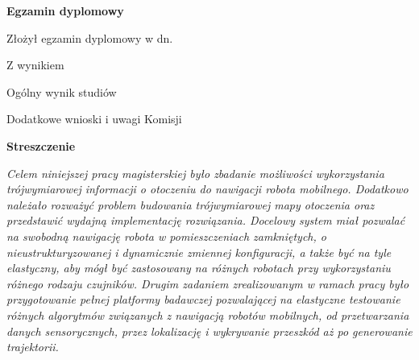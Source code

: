 \begin{titlepage}
    \begin{center}
 	{\large\bfseries Egzamin dyplomowy} \par\bigskip\bigskip
    \end{center}
    \par\noindent\vspace{1.5\baselineskip}
    Złożył egzamin dyplomowy w dn. \dotfill
    \par\noindent\vspace{1.5\baselineskip}
    Z wynikiem \dotfill
    \par\noindent\vspace{1.5\baselineskip}
    Ogólny wynik studiów \dotfill
    \par\noindent\vspace{1.5\baselineskip}
    Dodatkowe wnioski i uwagi Komisji \dotfill
    \par\noindent\vspace{1.5\baselineskip}
    \dotfill


	    \cleardoublepage
    \newpage\thispagestyle{empty}
    \begin{center}
	{\large\bfseries Streszczenie}\par\bigskip
    \end{center}

    {\itshape
    Celem niniejszej pracy magisterskiej było zbadanie możliwości wykorzystania
    trójwymiarowej informacji o otoczeniu do nawigacji robota mobilnego. Dodatkowo
    należało rozważyć problem budowania trójwymiarowej mapy otoczenia oraz przedstawić
    wydajną implementację rozwiązania. Docelowy system miał pozwalać na swobodną
    nawigację robota w pomieszczeniach zamkniętych, o nieustrukturyzowanej i
    dynamicznie zmiennej konfiguracji, a także być na tyle elastyczny, aby mógł być
    zastosowany na różnych robotach przy wykorzystaniu różnego rodzaju czujników.
    Drugim zadaniem zrealizowanym w ramach pracy było przygotowanie pełnej platformy
    badawczej pozwalającej na elastyczne testowanie różnych algorytmów związanych
    z nawigacją robotów mobilnych, od przetwarzania danych sensorycznych, przez
    lokalizację i wykrywanie przeszkód aż po generowanie trajektorii.
    
}
\end{titlepage}
